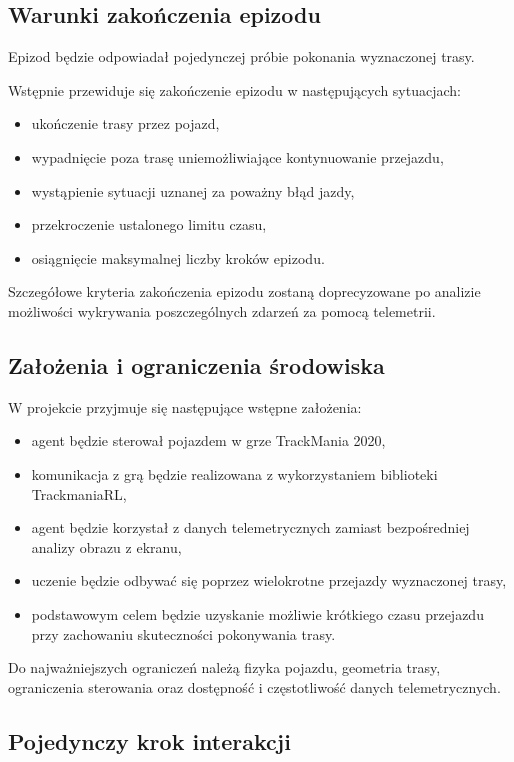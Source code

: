 \documentclass[12pt]{article}
\begin{document}
\subsection{Warunki zakończenia epizodu}

Epizod będzie odpowiadał pojedynczej próbie pokonania wyznaczonej trasy.

Wstępnie przewiduje się zakończenie epizodu w następujących sytuacjach:
\begin{itemize}
    \item ukończenie trasy przez pojazd,
    \item wypadnięcie poza trasę uniemożliwiające kontynuowanie przejazdu,
    \item wystąpienie sytuacji uznanej za poważny błąd jazdy,
    \item przekroczenie ustalonego limitu czasu,
    \item osiągnięcie maksymalnej liczby kroków epizodu.
\end{itemize}

Szczegółowe kryteria zakończenia epizodu zostaną doprecyzowane po analizie możliwości wykrywania poszczególnych zdarzeń za pomocą telemetrii.

\subsection{Założenia i ograniczenia środowiska}

W projekcie przyjmuje się następujące wstępne założenia:
\begin{itemize}
    \item agent będzie sterował pojazdem w grze TrackMania 2020,
    \item komunikacja z grą będzie realizowana z wykorzystaniem biblioteki TrackmaniaRL,
    \item agent będzie korzystał z danych telemetrycznych zamiast bezpośredniej analizy obrazu z ekranu,
    \item uczenie będzie odbywać się poprzez wielokrotne przejazdy wyznaczonej trasy,
    \item podstawowym celem będzie uzyskanie możliwie krótkiego czasu przejazdu przy zachowaniu skuteczności pokonywania trasy.
\end{itemize}

Do najważniejszych ograniczeń należą fizyka pojazdu, geometria trasy, ograniczenia sterowania oraz dostępność i częstotliwość danych telemetrycznych.

\subsection{Pojedynczy krok interakcji}
\end{document}
